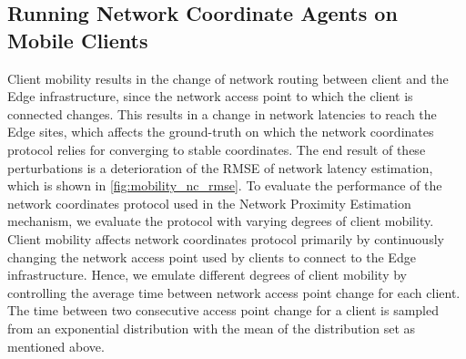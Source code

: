 \subsection{Running Network Coordinate Agents on Mobile Clients}
Client mobility results in the change of network routing between client and the Edge infrastructure, since the network access point to which the client is connected changes. This results in a change in network latencies to reach the Edge sites, which affects the ground-truth on which the network coordinates protocol relies for converging to stable coordinates. The end result of these perturbations is a deterioration of the RMSE of network latency estimation, which is shown in \cref{fig:mobility_nc_rmse}. To evaluate the performance of the network coordinates protocol used in the Network Proximity Estimation mechanism, we evaluate the protocol with varying degrees of client mobility. Client mobility affects network coordinates protocol primarily by continuously changing the network access point used by clients to connect to the Edge infrastructure. Hence, we emulate different degrees of client mobility by controlling the average time between network access point change for each client. The time between two consecutive access point change for a client is sampled from an exponential distribution with the mean of the distribution set as mentioned above.
